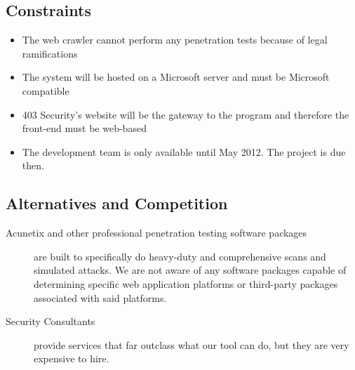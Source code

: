 \subsection{Constraints}
\begin{itemize}
    \item The web crawler cannot perform any penetration tests because of legal ramifications
    \item The system will be hosted on a Microsoft server and must be Microsoft compatible
    \item 403 Security's website will be the gateway to the program and therefore the front-end must be web-based
    \item The development team is only available until May 2012.  The project is due then.
\end{itemize}

\subsection{Alternatives and Competition}
\begin{description}
\item[Acunetix and other professional penetration testing software packages]{ are built to specifically do heavy-duty and comprehensive scans and simulated attacks. We are not aware of any software packages capable of determining specific web application platforms or third-party packages associated with said platforms.}

\item[Security Consultants]{ provide services that far outclass what our tool can do, but they are very expensive to hire.}
\end{description}
